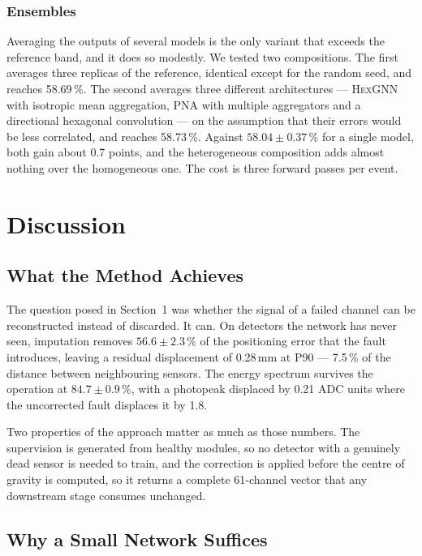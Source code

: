 \documentclass[10pt,conference]{IEEEtran}
\begin{document}
\subsubsection{Ensembles}
Averaging the outputs of several models is the only variant that exceeds the
reference band, and it does so modestly. We tested two compositions. The first
averages three replicas of the reference, identical except for the random seed,
and reaches 58.69\,\%. The second averages three different architectures ---
\textsc{HexGNN} with isotropic mean aggregation, PNA with multiple aggregators
and a directional hexagonal convolution --- on the assumption that their errors
would be less correlated, and reaches 58.73\,\%. Against $58.04 \pm 0.37$\,\%
for a single model, both gain about 0.7 points, and the heterogeneous
composition adds almost nothing over the homogeneous one. The cost is three
forward passes per event.


\section{Discussion}
\label{sec:discussion}

\subsection{What the Method Achieves}

The question posed in Section~1 was whether the signal of a failed channel can
be reconstructed instead of discarded. It can. On detectors the network has
never seen, imputation removes $56.6 \pm 2.3$\,\% of the positioning error that
the fault introduces, leaving a residual displacement of 0.28\,mm at P90 ---
7.5\,\% of the distance between neighbouring sensors. The energy spectrum
survives the operation at $84.7 \pm 0.9$\,\%, with a photopeak displaced by
0.21 ADC units where the uncorrected fault displaces it by 1.8.

Two properties of the approach matter as much as those numbers. The supervision
is generated from healthy modules, so no detector with a genuinely dead sensor
is needed to train, and the correction is applied before the centre of gravity
is computed, so it returns a complete 61-channel vector that any downstream
stage consumes unchanged.

\subsection{Why a Small Network Suffices}
\end{document}

